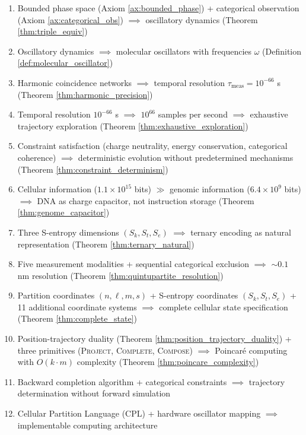 \documentclass[11pt,a4paper]{article}
\theoremstyle{remark}
\newcommand{\Sk}{S_k}
\newcommand{\St}{S_t}
\newcommand{\Se}{S_e}
\begin{document}
\begin{enumerate}
\item Bounded phase space (Axiom \ref{ax:bounded_phase}) + categorical observation (Axiom \ref{ax:categorical_obs}) $\implies$ oscillatory dynamics (Theorem \ref{thm:triple_equiv})

\item Oscillatory dynamics $\implies$ molecular oscillators with frequencies $\omega$ (Definition \ref{def:molecular_oscillator})

\item Harmonic coincidence networks $\implies$ temporal resolution $\tau_{\text{meas}} = 10^{-66}$ s (Theorem \ref{thm:harmonic_precision})

\item Temporal resolution $10^{-66}$ s $\implies$ $10^{66}$ samples per second $\implies$ exhaustive trajectory exploration (Theorem \ref{thm:exhaustive_exploration})

\item Constraint satisfaction (charge neutrality, energy conservation, categorical coherence) $\implies$ deterministic evolution without predetermined mechanisms (Theorem \ref{thm:constraint_determinism})

\item Cellular information ($1.1 \times 10^{15}$ bits) $\gg$ genomic information ($6.4 \times 10^9$ bits) $\implies$ DNA as charge capacitor, not instruction storage (Theorem \ref{thm:genome_capacitor})

\item Three S-entropy dimensions $(\Sk, \St, \Se)$ $\implies$ ternary encoding as natural representation (Theorem \ref{thm:ternary_natural})

\item Five measurement modalities + sequential categorical exclusion $\implies$ $\sim 0.1$ nm resolution (Theorem \ref{thm:quintupartite_resolution})

\item Partition coordinates $(n,\ell,m,s)$ + S-entropy coordinates $(\Sk,\St,\Se)$ + 11 additional coordinate systems $\implies$ complete cellular state specification (Theorem \ref{thm:complete_state})

\item Position-trajectory duality (Theorem \ref{thm:position_trajectory_duality}) + three primitives (\textsc{Project}, \textsc{Complete}, \textsc{Compose}) $\implies$ Poincar\'{e} computing with $O(k \cdot m)$ complexity (Theorem \ref{thm:poincare_complexity})

\item Backward completion algorithm + categorical constraints $\implies$ trajectory determination without forward simulation

\item Cellular Partition Language (CPL) + hardware oscillator mapping $\implies$ implementable computing architecture
\end{enumerate}
\end{document}
